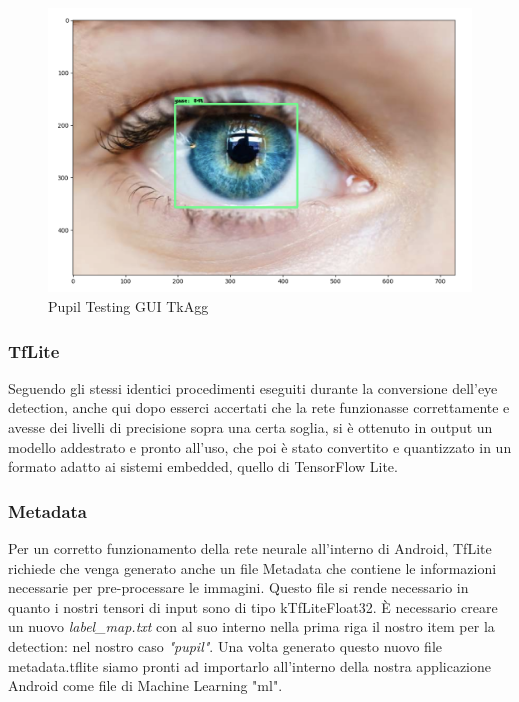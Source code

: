 \documentclass[11pt]{article}
\begin{document}
\begin{figure}[h]
\caption{Pupil Testing GUI TkAgg }
\centering
\includegraphics[scale=0.18]{img/pupilla.png}
\end{figure}

\subsubsection{TfLite}
\label{sub:tfl}
Seguendo gli stessi identici procedimenti eseguiti durante la conversione dell'eye detection, anche qui dopo esserci accertati che la rete funzionasse correttamente e avesse dei livelli di precisione sopra una certa soglia, si è ottenuto in output un modello addestrato
e pronto all’uso, che poi è stato convertito e quantizzato in un formato adatto ai sistemi embedded, quello di TensorFlow Lite.
\subsubsection{Metadata}
\label{sub:met}
Per un corretto funzionamento della rete neurale all'interno di Android, TfLite richiede che venga generato anche un file Metadata che contiene le informazioni necessarie per pre-processare le immagini. Questo file si rende necessario in quanto i nostri tensori di input sono di tipo kTfLiteFloat32. È necessario creare un nuovo \textit{label\_map.txt} con al suo interno nella prima riga il nostro item per la detection: nel nostro caso \textit{"pupil"}.
\newline
Una volta generato questo nuovo file metadata.tflite siamo pronti ad importarlo all'interno della nostra applicazione Android come file di Machine Learning "ml".

\newpage
\end{document}
